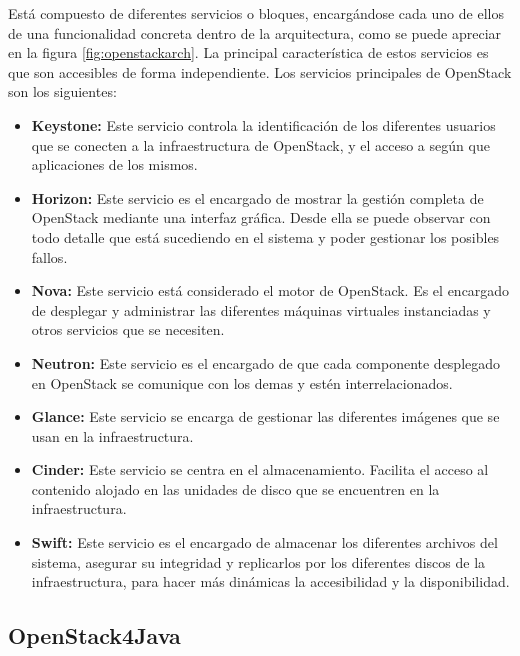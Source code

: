 Está compuesto de diferentes servicios o bloques, encargándose cada uno de ellos de una funcionalidad concreta dentro de la arquitectura, como se puede apreciar en la figura \ref{fig:openstackarch}. La principal característica de estos servicios es que son accesibles de forma independiente. Los servicios principales de OpenStack son los siguientes:

\begin{itemize}
	\item \textbf{Keystone:}  Este servicio controla la identificación de los diferentes usuarios que se conecten a la infraestructura de OpenStack, y el acceso a según que aplicaciones de los mismos.
	
	\item \textbf{Horizon:} Este servicio es el encargado de mostrar la gestión completa de OpenStack mediante una interfaz gráfica. Desde ella se puede observar con todo detalle que está sucediendo en el sistema y poder gestionar los posibles fallos.
	
	\item \textbf{Nova:} Este servicio está considerado el motor de OpenStack. Es el encargado de desplegar y administrar las diferentes máquinas virtuales instanciadas y otros servicios que se necesiten.
	
	\item \textbf{Neutron:} Este servicio es el encargado de que cada componente desplegado en OpenStack se comunique con los demas y estén interrelacionados.
	
	\item \textbf{Glance:} Este servicio se encarga de gestionar las diferentes imágenes que se usan en la infraestructura.
	
	\item \textbf{Cinder:} Este servicio se centra en el almacenamiento. Facilita el acceso al contenido alojado en las unidades de disco que se encuentren en la infraestructura.
	
	\item \textbf{Swift:} Este servicio es el encargado de almacenar los diferentes archivos del sistema, asegurar su integridad y replicarlos por los diferentes discos de la infraestructura, para hacer más dinámicas la accesibilidad y la disponibilidad.
\end{itemize}

\subsection{OpenStack4Java}
\label{subsec:openstack4j}

